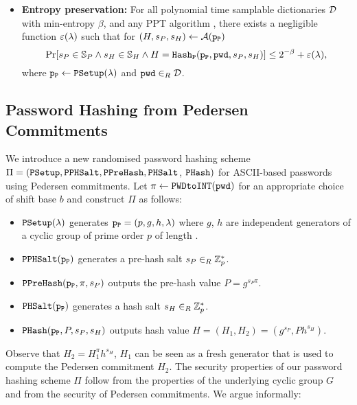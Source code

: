 \begin{itemize}
\item \textbf{Entropy preservation:} 
    For all polynomial time samplable dictionaries $\mathcal{D}$ with min-entropy $\beta$, and any \ac{PPT} algorithm \cA, there exists a negligible function $\varepsilon(\lambda)$ such that for $(H,s_P,s_H)\gets \mathcal{A}(\mathtt{p_P})$
      \[\Pr[s_P\in\mathbb{S}_P \wedge s_H\in\mathbb{S}_H \wedge H=\mathtt{Hash_P}(\mathtt{p_P},\mathtt{pwd},s_P,s_H)] \leq 2^{-\beta} + \varepsilon(\lambda),\]
      where $\mathtt{p_P}\gets\mathtt{PSetup}(\lambda)$ and $\mathtt{pwd}\in_R\mathcal{D}$.
\end{itemize}

\subsection{Password Hashing from Pedersen Commitments}\label{sec:pwhashped}
We introduce a new randomised password hashing scheme $\Pi=(\mathtt{PSetup},\mathtt{PPHSalt},\allowbreak\mathtt{PPreHash},\allowbreak\mathtt{PHSalt}$, $\mathtt{PHash})$ for \ac{ASCII}-based passwords using Pedersen commitments. 
Let $\pi\gets\texttt{PWDtoINT}(\mathtt{pwd})$ for an appropriate choice of shift base $b$ and construct $\Pi$ as follows:

\begin{itemize}
	\item $\mathtt{PSetup}(\lambda)$ generates $\mathtt{p_P}= (p,g,h,\lambda)$ where $g$, $h$ are independent generators of a cyclic group \GG of prime order $p$ of length \secpar.
	\item $\mathtt{PPHSalt}(\mathtt{p_P})$ generates a pre-hash salt $s_P\in_R\mathbb{Z}^\ast_p$.
	\item $\mathtt{PPreHash}(\mathtt{p_P}, \pi, s_P)$ outputs the pre-hash value $P=g^{s_P\pi}$.
	\item $\mathtt{PHSalt}(\mathtt{p_P})$ generates a hash salt $s_H\in_R\mathbb{Z}^\ast_p$.
	\item $\mathtt{PHash}(\mathtt{p_P}, P, s_P, s_H)$ outputs hash value $H=(H_1, H_2)=(g^{s_P}, Ph^{s_H})$.
\end{itemize}

\noindent
Observe that $H_2=H_1^\pi h^{s_H}$, \ie $H_1$ can be seen as a fresh generator that is used to compute the Pedersen commitment $H_2$.
The security properties of our password hashing scheme $\Pi$ follow from the properties of the underlying cyclic group $G$ and from the security of Pedersen commitments. 
We argue informally:

